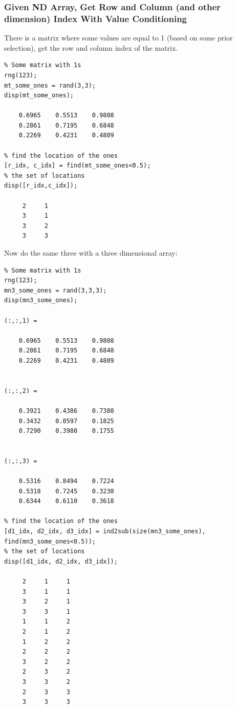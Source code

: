 \documentclass[
]{book}
\begin{document}
\hypertarget{given-nd-array-get-row-and-column-and-other-dimension-index-with-value-conditioning}{%
\subsubsection{Given ND Array, Get Row and Column (and other dimension) Index With Value Conditioning}\label{given-nd-array-get-row-and-column-and-other-dimension-index-with-value-conditioning}}

There is a matrix where some values are equal to 1 (based on some prior
selection), get the row and column index of the matrix.

\begin{verbatim}
% Some matrix with 1s
rng(123);
mt_some_ones = rand(3,3);
disp(mt_some_ones);

    0.6965    0.5513    0.9808
    0.2861    0.7195    0.6848
    0.2269    0.4231    0.4809

% find the location of the ones
[r_idx, c_idx] = find(mt_some_ones<0.5);
% the set of locations
disp([r_idx,c_idx]);

     2     1
     3     1
     3     2
     3     3
\end{verbatim}

Now do the same three with a three dimensional array:

\begin{verbatim}
% Some matrix with 1s
rng(123);
mn3_some_ones = rand(3,3,3);
disp(mn3_some_ones);

(:,:,1) =

    0.6965    0.5513    0.9808
    0.2861    0.7195    0.6848
    0.2269    0.4231    0.4809


(:,:,2) =

    0.3921    0.4386    0.7380
    0.3432    0.0597    0.1825
    0.7290    0.3980    0.1755


(:,:,3) =

    0.5316    0.8494    0.7224
    0.5318    0.7245    0.3230
    0.6344    0.6110    0.3618

% find the location of the ones
[d1_idx, d2_idx, d3_idx] = ind2sub(size(mn3_some_ones), find(mn3_some_ones<0.5));
% the set of locations
disp([d1_idx, d2_idx, d3_idx]);

     2     1     1
     3     1     1
     3     2     1
     3     3     1
     1     1     2
     2     1     2
     1     2     2
     2     2     2
     3     2     2
     2     3     2
     3     3     2
     2     3     3
     3     3     3
\end{verbatim}
\end{document}

